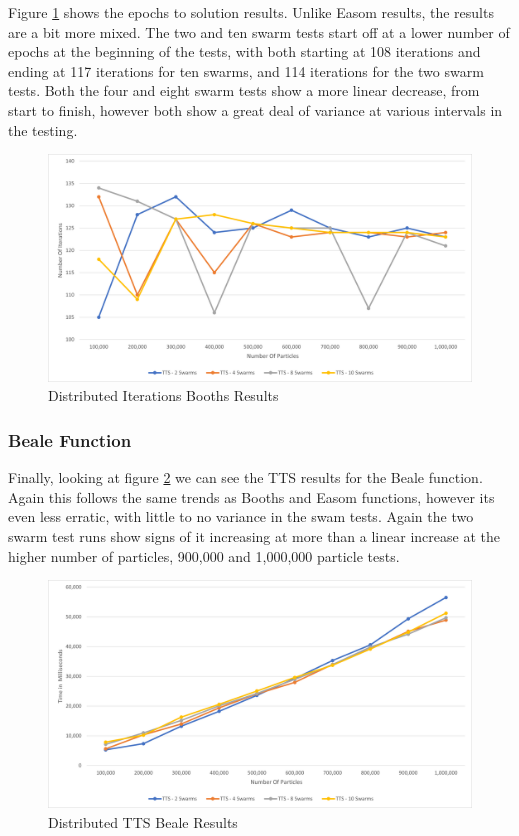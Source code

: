 \documentclass[oneside,12pt]{book}
\begin{document}
Figure \ref{fig:Distributed_Epoc_Booths_Results} shows the epochs to solution results. Unlike Easom results, the results are a bit more mixed. The two and ten swarm tests start off at a lower number of epochs at the beginning of the tests, with both starting at 108 iterations and ending at 117 iterations for ten swarms, and 114 iterations for the two swarm tests. Both the four and eight swarm tests show a more linear decrease, from start to finish, however both show a great deal of variance at various intervals in the testing. 

\begin{figure}[H]
    \centering
    \includegraphics[scale=0.45]{Images/Graphs/DistributedBoothsEpoch.png}
    \caption{Distributed Iterations Booths Results}
    \label{fig:Distributed_Epoc_Booths_Results}
\end{figure}

\subsubsection{Beale Function}
Finally, looking at figure \ref{fig:Distributed_TTS_Beale_Results} we can see the TTS results for the Beale function. Again this follows the same trends as Booths and Easom functions, however its even less erratic, with little to no variance in the swam tests. Again the two swarm test runs show signs of it increasing at more than a linear increase at the higher number of particles, 900,000 and 1,000,000 particle tests. 
\begin{figure}[H]
    \centering
    \includegraphics[scale=0.45]{Images/Graphs/DistributedBealeTTS.png}
    \caption{Distributed TTS Beale Results}
    \label{fig:Distributed_TTS_Beale_Results}
\end{figure}
\end{document}
